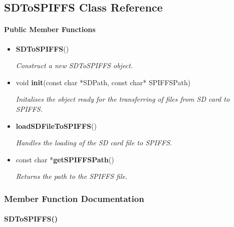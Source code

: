 \subsection{SDToSPIFFS Class Reference}
        \label{subsec:sdtospiffs}\mbox{}

                \paragraph{Public Member Functions}\mbox{}

                    \begin{itemize}
                        \item \textbf{SDToSPIFFS}() 
                        
                            \textit{Construct a new SDToSPIFFS object.}

                        \item void \textbf{init}(const char *SDPath, const char* SPIFFSPath) 
                        
                            \textit{Initalises the object ready for the transferring of files from SD card to SPIFFS.}

                        \item \textbf{loadSDFileToSPIFFS}() 
                        
                            \textit{Handles the loading of the SD card file to SPIFFS.}

                        \item const char *\textbf{getSPIFFSPath}() 
                        
                            \textit{Returns the path to the SPIFFS file.}
                    \end{itemize}

            \subsubsection{Member Function Documentation}\mbox{}

                \paragraph{SDToSPIFFS()}\mbox{}\\

                    \\

